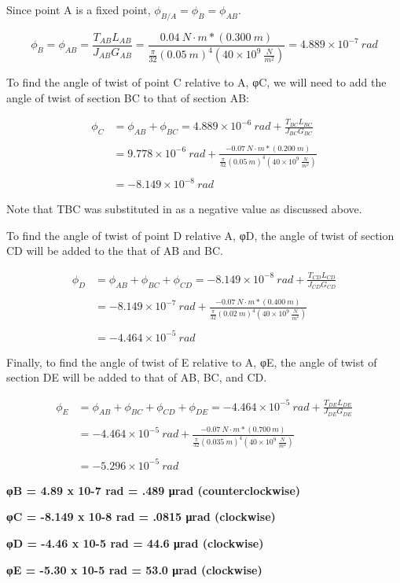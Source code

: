 \documentclass[
  letterpaper,
  DIV=11,
  numbers=noendperiod]{scrreprt}
\theoremstyle{definition}
\theoremstyle{remark}
\begin{document}
\begin{tcolorbox}
\begin{tcolorbox}
Since point A is a fixed point, \(\phi_{B / A}=\phi_B=\phi_{A B}\).

\[
\phi_B=\phi_{A B}=\frac{T_{AB}L_{AB}}{J_{AB}G_{AB}}=\frac{0.04{~N}\cdot{m}*(0.300{~m})}{\frac{\pi}{32}(0.05{~m})^4\left(40 \times 10^9~\frac{N}{{m}^2}\right)}=4.889 \times 10^{-7}{~rad}
\]

To find the angle of twist of point C relative to A, φC, we will need to
add the angle of twist of section BC to that of section AB:

\[
\begin{aligned}
\phi_C&=\phi_{A B}+\phi_{BC}=4.889\times 10^{-6}{~rad}+\frac{T_{BC}L_{BC}}{J_{BC}G_{BC}} \\
\\
&=9.778\times10^{-6}{~rad}+\frac{-0.07{~N}\cdot{m}*(0.200{~m})}{\frac{\pi}{32}(0.05{~m})^4\left(40 \times 10^9~\frac{{N}}{{m}^2}\right)} \\
\\
&=-8.149 \times 10^{-8}{~rad}
\end{aligned}
\]

Note that TBC was substituted in as a negative value as discussed above.

To find the angle of twist of point D relative A, φD, the angle of twist
of section CD will be added to the that of AB and BC.

\[
\begin{aligned}
\phi_D&=\phi_{AB}+\phi_{BC}+\phi_{CD}=-8.149\times10^{-8} {~rad}+\frac{T_{CD}L_{CD}}{J_{CD}G_{CD}} \\
\\
&=-8.149 \times 10^{-7}{~rad}+\frac{-0.07{~N}\cdot{m}*(0.400{~m})}{\frac{\pi}{32}(0.02{~m})^4\left(40 \times 10^9~\frac{{N}}{{m}^2}\right)} \\
\\
&=-4.464 \times 10^{-5} {~rad}
\end{aligned}
\]

Finally, to find the angle of twist of E relative to A, φE, the angle of
twist of section DE will be added to that of AB, BC, and CD.

\[
\begin{aligned}
\phi_E&=\phi_{AB}+\phi_{BC}+\phi_{CD}+\phi_{DE}=-4.464\times 10^{-5}{~rad}+\frac{T_{DE}L_{DE}}{J_{DE}G_{DE}} \\
\\
&=-4.464\times 10^{-5}{~rad}+\frac{-0.07{~N}\cdot{m}*(0.700{~m})}{\frac{\pi}{32}(0.035{~m})^4\left(40\times 10^9~\frac{{N}}{{m}^2}\right)} \\
\\
&=-5.296\times 10^{-5} {~rad}
\end{aligned}
\]

\textbf{φB = 4.89 x 10-7 rad = .489 μrad (counterclockwise)}

\textbf{φC = -8.149 x 10-8 rad = .0815 μrad (clockwise)}

\textbf{φD = -4.46 x 10-5 rad = 44.6 μrad (clockwise)}

\textbf{φE = -5.30 x 10-5 rad = 53.0 μrad (clockwise)}

\end{tcolorbox}

\end{tcolorbox}
\end{document}
